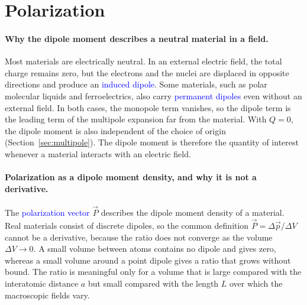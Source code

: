 \section{Polarization}
\label{sec:polarization}

\paragraph{Why the dipole moment describes a neutral material in a field.}
Most materials are electrically neutral. In an external electric field, the total charge remains zero, but the electrons and the nuclei are displaced in opposite directions and produce an \textcolor{blue}{induced dipole}. Some materials, such as polar molecular liquids and ferroelectrics, also carry \textcolor{blue}{permanent dipoles} even without an external field. In both cases, the monopole term vanishes, so the dipole term is the leading term of the multipole expansion far from the material. With $Q = 0$, the dipole moment is also independent of the choice of origin (Section~\ref{sec:multipole}). The dipole moment is therefore the quantity of interest whenever a material interacts with an electric field.

\paragraph{Polarization as a dipole moment density, and why it is not a derivative.}
The \textcolor{blue}{polarization vector} $\vec P$ describes the dipole moment density of a material. Real materials consist of discrete dipoles, so the common definition $\vec P = \Delta\vec p/\Delta V$ cannot be a derivative, because the ratio does not converge as the volume $\Delta V \to 0$. A small volume between atoms contains no dipole and gives zero, whereas a small volume around a point dipole gives a ratio that grows without bound. The ratio is meaningful only for a volume that is large compared with the interatomic distance $a$ but small compared with the length $L$ over which the macroscopic fields vary.

